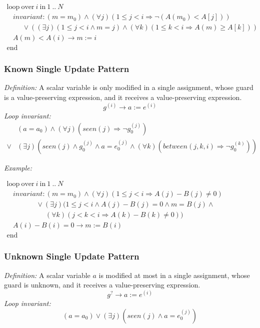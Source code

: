 \documentclass[a4paper,10pt]{article}
\newcommand{\idx}{\ensuremath{i}\xspace}
\newcommand{\at}[1]{{(#1)}}
\newcommand{\KWloop}{\ensuremath{\mathrm{loop}~}}
\newcommand{\KWend}{\ensuremath{\mathrm{end}~}}
\newcommand{\KWover}{\ensuremath{\mathrm{over}~}}
\newcommand{\KWin}{\ensuremath{~\mathrm{in}~}}
\newcommand{\impl}{\ensuremath{\Longrightarrow}}
\newcommand{\seen}[1]{\ensuremath{\mathit{seen}(#1)}\xspace}
\newcommand{\between}[3]{\ensuremath{\mathit{between}{(#1,#2,#3)}}\xspace}
\newcommand{\loopinvariant}{\noindent\textit{Loop invariant:}\xspace}
\newcommand{\patterndef}{\noindent\textit{Definition:}\xspace}
\newcommand{\patternexample}{\noindent\textit{Example:}\xspace}
\begin{document}
\medskip
$\begin{array}{l}
  \KWloop \KWover i \KWin 1~..~N \\
  ~~~~ \textit{invariant}: (m = m_0) \land (\forall j)(1\leq j < i \impl \neg (A(m_0) < A[j]))\\
  ~~~~~~~~~~ \lor ((\exists j)(1\leq j < i \land m = j) \land (\forall k)(1\leq k < i \impl A(m) \geq A[k]))\\
  ~~~~ A(m) < A(i) \rightarrow m := i\\
  \KWend
\end{array}$

\subsubsection*{Known Single Update Pattern}

\patterndef A scalar variable is only modified in a single assignment, whose
guard is a value-preserving expression, and it receives a value-preserving expression.
%
$$g^\at{\idx} \rightarrow a := e^\at{\idx}$$
%
\loopinvariant
%
\begin{eqnarray*}
&(a = a_0) \land (\forall j)(\seen{j} \impl \neg g_0^\at{j})\\
\lor 
& (\exists j)(\seen{j} \land g_0^\at{j} \land a = e_0^\at{j} \land (\forall k)(\between{j}{k}{\idx} \impl \neg g_0^\at{k}))
\end{eqnarray*}

\bigskip
\patternexample

\medskip
$\begin{array}{l}
  \KWloop \KWover i \KWin 1~..~N \\
  ~~~~ \textit{invariant}: (m = m_0) \land (\forall j)(1\leq j < i \impl A(j)-B(j)\neq0)\\
  ~~~~~~~~~~~~~~~~~~~ \lor (\exists j)(1\leq j < i \land A(j)-B(j)= 0 \land m = B(j) \land \\
  ~~~~~~~~~~~~~~~~~~~~~~~~~ (\forall k)(j < k < i \impl A(k)-B(k)\neq0))\\
  ~~~~ A(i)-B(i)=0 \rightarrow m := B(i)\\
  \KWend
\end{array}$

\subsubsection*{Unknown Single Update Pattern}

\patterndef A scalar variable $a$ is modified at most in a single assignment, whose
guard is unknown, and it receives a value-preserving expression.
%
$$g^? \rightarrow a := e^\at{\idx}$$
%
\loopinvariant
%
$$(a = a_0) \lor (\exists j)(\seen{j} \land a = e_0^\at{j})$$
\end{document}
